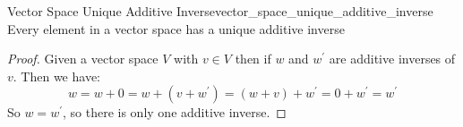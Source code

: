 \begin{proposition}{Vector Space Unique Additive
Inverse}{vector_space_unique_additive_inverse}
Every element in a vector space has a unique additive inverse
\end{proposition}
\begin{proof}
Given a vector space \( V \) with \( v \in  V \) then if \( w \) and \( w ^{
\prime  }  \) are additive inverses of \( v \). Then we have:
\[
w =  w +  0 =  w +  \left( v +  w ^{ \prime  }  \right) =  \left( w +  v \right)
+  w ^{ \prime  } = 0 +  w ^{ \prime  } =  w ^{ \prime  } 
\]
So \( w =  w ^{  \prime  }  \), so there is only one additive inverse.
\end{proof}

